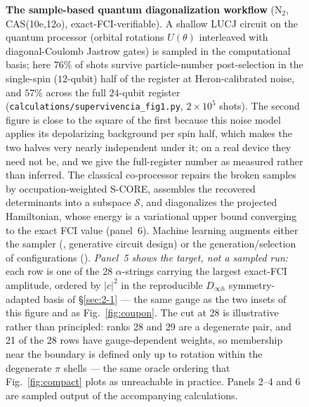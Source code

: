 \documentclass[onecolumn,a4paper]{quantumarticle}
\newcommand{\ent}[1]{\raisebox{0.1ex}{\textcircled{\scriptsize #1}}}
\begin{document}
\begin{figure}[tbp]
\caption{\textbf{The sample-based quantum diagonalization workflow} (N$_2$, CAS(10e,12o), exact-FCI-verifiable). A shallow LUCJ circuit on the quantum processor (orbital rotations $U(\theta)$ interleaved with diagonal-Coulomb Jastrow gates) is sampled in the computational basis; here $76\%$ of shots survive particle-number post-selection in the single-spin ($12$-qubit) half of the register at Heron-calibrated noise, and $57\%$ across the full $24$-qubit register (\texttt{calculations/supervivencia\_fig1.py}, $2\times10^{5}$ shots). The second figure is close to the square of the first because this noise model applies its depolarizing background per spin half, which makes the two halves very nearly independent under it; on a real device they need not be, and we give the full-register number as measured rather than inferred. The classical co-processor repairs the broken samples by occupation-weighted S-CORE, assembles the recovered determinants into a subspace $\mathcal{S}$, and diagonalizes the projected Hamiltonian, whose energy is a variational upper bound converging to the exact FCI value (panel~6). Machine learning augments either the sampler (\ent{1}, generative circuit design) or the generation/selection of configurations (\ent{2}). \emph{Panel~5 shows the target, not a sampled run:} each row is one of the 28 $\alpha$-strings carrying the largest exact-FCI amplitude, ordered by $|c|^2$ in the reproducible $D_{\infty h}$ symmetry-adapted basis of \S\ref{sec:2-1} --- the same gauge as the two insets of this figure and as Fig.~\ref{fig:coupon}.  The cut at 28 is illustrative rather than principled: ranks 28 and 29 are a degenerate pair, and 21 of the 28 rows have gauge-dependent weights, so membership near the boundary is defined only up to rotation within the degenerate $\pi$ shells --- the same oracle ordering that Fig.~\ref{fig:compact} plots as unreachable in practice. Panels 2--4 and 6 are sampled output of the accompanying calculations.}
\label{fig:loop}
\end{figure}
\end{document}
